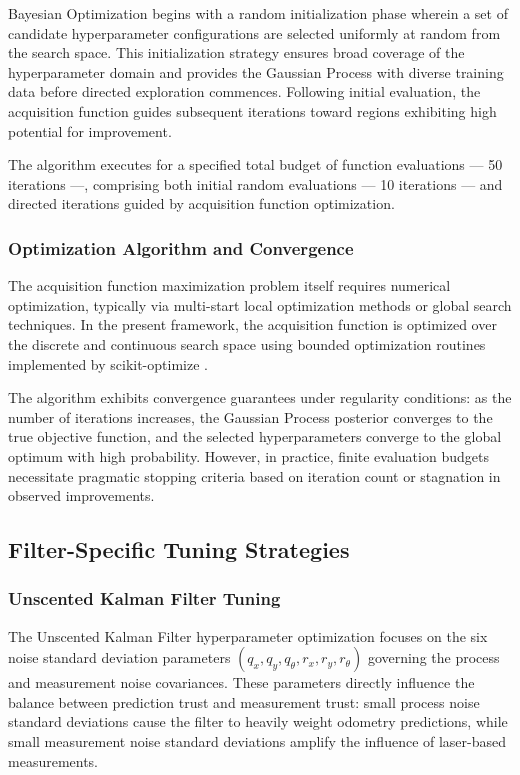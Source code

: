 \documentclass[conference]{IEEEtran}
\begin{document}
Bayesian Optimization begins with a random initialization phase wherein a set of candidate hyperparameter configurations are selected uniformly at random from the search space. This initialization strategy ensures broad coverage of the hyperparameter domain and provides the Gaussian Process with diverse training data before directed exploration commences. Following initial evaluation, the acquisition function guides subsequent iterations toward regions exhibiting high potential for improvement.

The algorithm executes for a specified total budget of function evaluations — 50 iterations —, comprising both initial random evaluations — 10 iterations — and directed iterations guided by acquisition function optimization.

\subsubsection{Optimization Algorithm and Convergence}

The acquisition function maximization problem itself requires numerical optimization, typically via multi-start local optimization methods or global search techniques. In the present framework, the acquisition function is optimized over the discrete and continuous search space using bounded optimization routines implemented by scikit-optimize \cite{scikit-optimize}.

The algorithm exhibits convergence guarantees under regularity conditions: as the number of iterations increases, the Gaussian Process posterior converges to the true objective function, and the selected hyperparameters converge to the global optimum with high probability. However, in practice, finite evaluation budgets necessitate pragmatic stopping criteria based on iteration count or stagnation in observed improvements.

\subsection{Filter-Specific Tuning Strategies}

\subsubsection{Unscented Kalman Filter Tuning}

The Unscented Kalman Filter hyperparameter optimization focuses on the six noise standard deviation parameters $(q_x, q_y, q_\theta, r_x, r_y, r_\theta)$ governing the process and measurement noise covariances. These parameters directly influence the balance between prediction trust and measurement trust: small process noise standard deviations cause the filter to heavily weight odometry predictions, while small measurement noise standard deviations amplify the influence of laser-based measurements.
\end{document}
